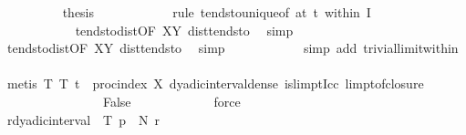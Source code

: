 \begin{isabellebody}
\ \ \ \ \ \ \ \ \isamarkupfalse%
\ {\isacharquery}{\kern0pt}thesis\isanewline
\ \ \ \ \ \ \ \ \ \ \isamarkupfalse%
\ {\isacharparenleft}{\kern0pt}rule\ tendsto{\isacharunderscore}{\kern0pt}unique{\isacharbrackleft}{\kern0pt}of\ {\isachardoublequoteopen}at\ t\ within\ {\isacharquery}{\kern0pt}I{\isachardoublequoteclose}{\isacharbrackright}{\kern0pt}{\isacharparenright}{\kern0pt}\isanewline
\ \ \ \ \ \ \ \ \ \ \isamarkupfalse%
\isanewline
\ \ \ \ \ \ \ \ \ \ \isamarkupfalse%
\ tendsto{\isacharunderscore}{\kern0pt}dist{\isacharbrackleft}{\kern0pt}OF\ XY{\isacharbrackright}{\kern0pt}\ dist{\isacharunderscore}{\kern0pt}tendsto{\isacharunderscore}{\kern0pt}{}\ \isamarkupfalse%
\ simp\isanewline
\ \ \ \ \ \ \ \ \ \ \isamarkupfalse%
\ tendsto{\isacharunderscore}{\kern0pt}dist{\isacharbrackleft}{\kern0pt}OF\ XY{\isacharbrackright}{\kern0pt}\ dist{\isacharunderscore}{\kern0pt}tendsto{\isacharunderscore}{\kern0pt}{}\ \isamarkupfalse%
\ simp\isanewline
\ \ \ \ \ \ \ \ \ \ \isamarkupfalse%
\ {\isacharparenleft}{\kern0pt}simp\ add{\isacharcolon}{\kern0pt}\ trivial{\isacharunderscore}{\kern0pt}limit{\isacharunderscore}{\kern0pt}within{\isacharparenright}{\kern0pt}\isanewline
\ \ \ \ \ \ \ \ \ \ \isamarkupfalse%
\ {\isacharparenleft}{\kern0pt}metis\ T{\isacharparenleft}{\kern0pt}{}{\isacharparenright}{\kern0pt}\ T{\isacharparenleft}{\kern0pt}{}{\isacharparenright}{\kern0pt}\ {\isacartoucheopen}t\ {\isasymin}\ proc{\isacharunderscore}{\kern0pt}index\ X{\isacartoucheclose}\ dyadic{\isacharunderscore}{\kern0pt}interval{\isacharunderscore}{\kern0pt}dense\ islimpt{\isacharunderscore}{\kern0pt}Icc\ limpt{\isacharunderscore}{\kern0pt}of{\isacharunderscore}{\kern0pt}closure{\isacharparenright}{\kern0pt}\isanewline
\ \ \ \ \ \ \isamarkupfalse%
\isanewline
\ \ \ \ \ \ \isamarkupfalse%
\ \isamarkupfalse%
\ False\isanewline
\ \ \ \ \ \ \ \ \isamarkupfalse%
\ {\isasymepsilon}\ \isamarkupfalse%
\ force\isanewline
\ \ \ \ \isacommand{{\isacharbraceright}{\kern0pt}}\isamarkupfalse%
\isanewline
\ \ \ \ \isamarkupfalse%
\ \isamarkupfalse%
\ {\isachardoublequoteopen}{\isasymexists}r{\isasymin}dyadic{\isacharunderscore}{\kern0pt}interval\ {}\ T{\isachardot}{\kern0pt}\ p\ {\isasymin}\ N\ r{\isachardoublequoteclose}\isanewline
\ \ \ \ \ \ \isamarkupfalse%

\end{isabellebody}
